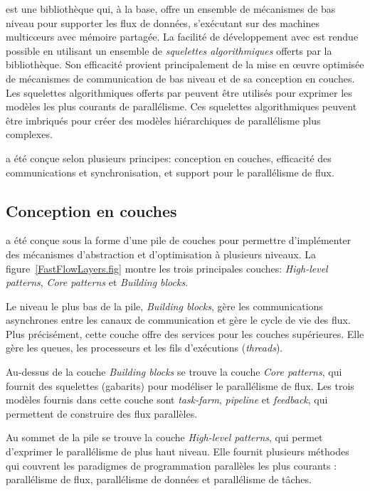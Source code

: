  est une biblioth\`eque  qui, \`a la base, offre un ensemble de m\'ecanismes de bas niveau pour supporter les flux de donn\'ees, s'ex\'ecutant sur des machines multicœurs avec m\'emoire partag\'ee. La facilit\'e de d\'eveloppement avec  est rendue possible en utilisant un ensemble de \emph{squelettes algorithmiques} offerts par la biblioth\`eque. Son efficacit\'e provient principalement de la mise en œuvre optimis\'ee de m\'ecanismes de communication de bas niveau et de sa conception en couches. Les squelettes algorithmiques offerts par  peuvent \^etre utilis\'es pour exprimer les mod\`eles les plus courants de parall\'elisme. Ces squelettes algorithmiques peuvent \^etre imbriqu\'es pour cr\'eer des mod\`eles hi\'erarchiques de parall\'elisme plus complexes.

 a \'et\'e conçue selon plusieurs principes: conception en couches, efficacit\'e des communications et synchronisation, et support pour le parall\'elisme de flux.

\subsection{Conception en couches}


 a \'et\'e conçue sous la forme d'une pile de couches pour permettre d'impl\'ementer des m\'ecanismes d'abstraction et d'optimisation \`a plusieurs niveaux. La figure~\ref{FastFlowLayers.fig} montre les trois principales couches: \emph{High-level patterns}, \emph{Core patterns} et \emph{Building blocks}. 

Le niveau le plus bas de la pile, \emph{Building blocks}, g\`ere les communications asynchrones entre les canaux de communication et g\`ere le cycle de vie des flux. Plus pr\'ecis\'ement, cette couche offre des services pour les couches sup\'erieures. Elle g\`ere les queues, les processeurs et les fils d'ex\'ecutions (\emph{threads}).

Au-dessus de la couche \emph{Building blocks} se trouve la couche \emph{Core patterns}, qui fournit des squelettes (gabarits) pour mod\'eliser le parall\'elisme de flux. Les trois mod\`eles fournis dans cette couche sont \emph{task-farm}, \emph{pipeline} et \emph{feedback}, qui permettent de construire des flux parall\`eles. 

Au sommet de la pile se trouve la couche \emph{High-level patterns}, qui permet d'exprimer le parall\'elisme de plus haut niveau. Elle fournit plusieurs m\'ethodes qui couvrent les paradigmes de programmation parall\`eles les plus courants : parall\'elisme de flux, parall\'elisme de donn\'ees et  parall\'elisme de t\^aches. 

